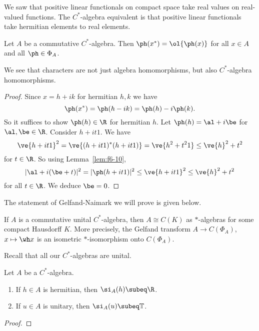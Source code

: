 We saw that positive linear functionals on compact space take real values on real-valued functions. The $C^*$-algebra equivalent is that positive linear functionals take hermitian elements to real elements.
\begin{lem}
Let $A$ be a commutative $C^*$-algebra. Then $\ph(x^*)=\ol{\ph(x)}$ for all $x\in A$ and all $\ph\in \Phi_A$. 
\end{lem}
We see that characters are not just algebra homomorphisms, but also $C^*$-algebra homomorphisms.
\begin{proof}
Since $x=h+ik$ for hermitian $h,k$ we have
\[
\ph(x^*)=\ph(h-ik)=\ph(h)-i\ph(k).
\]
So it suffices to show $\ph(h)\in \R$ for hermitian $h$. Let $\ph(h)=\al+i\be$ for $\al,\be\in \R$. Consider $h+it1$. We have 
\[
\ve{h+it1}^2=\ve{(h+it1)^*(h+it1)}
=\ve{h^2+t^21}\le \ve{h}^2+t^2
\]
for $t\in \R$. So using Lemma~\ref{lem:f6-10},
\[
|\al+i(\be+t)|^2=|\ph(h+it1)|^2\le \ve{h+it1}^2\le \ve{h}^2+t^2
\]
for all $t\in \R$. 
We deduce $\be=0$. %
\end{proof}
The statement of Gelfand-Naimark we will prove is given below.
\begin{thm}
If $A$ is a commutative unital $C^*$-algebra, then $A\cong C(K)$ as $*$-algebras for some compact Hausdorff $K$. More precisely, the Gelfand transform $A\to C(\Phi_A)$, $x\mapsto \wh x$ is an isometric $*$-isomorphism onto $C(\Phi_A)$.
\end{thm}
Recall that all our $C^*$-algebras are unital. 
\begin{cor}
Let $A$ be a $C^*$-algebra. 
\begin{enumerate}
\item
If $h\in A$ is hermitian, then $\si_A(h)\subeq \R$. 
\item
If $u\in A$ is unitary, then $\si_A(u)\subeq \mathbb T$.
\end{enumerate}
\end{cor}
\begin{proof}
\end{proof}
